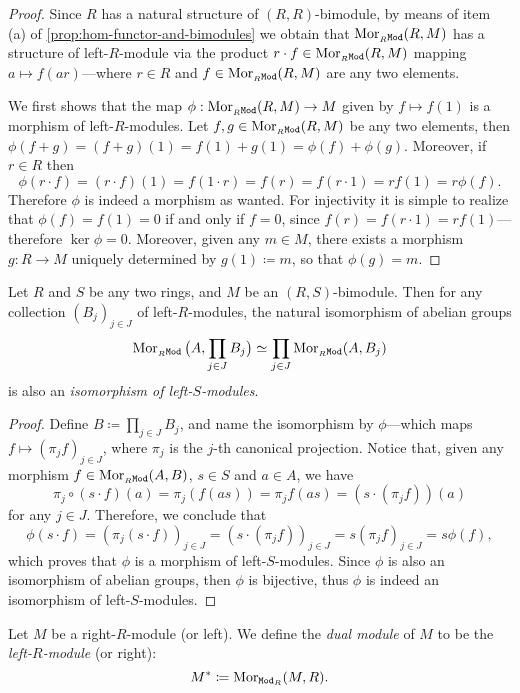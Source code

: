 \begin{proof}
Since \(R\) has a natural structure of \((R, R)\)-bimodule, by means of item (a)
of \cref{prop:hom-functor-and-bimodules} we obtain that
\(\operatorname{Mor}_{{{}_{R}\texttt{Mod}}}(R, M)\) has a structure of left-\(R\)-module via the product
\(r \cdot f \in \operatorname{Mor}_{{{}_{R}\texttt{Mod}}}(R, M)\) mapping \(a \mapsto f(a r)\)---where
\(r \in R\) and \(f \in \operatorname{Mor}_{{{}_{R}\texttt{Mod}}}(R, M)\) are any two elements.

We first shows that the map \(\phi: \operatorname{Mor}_{{{}_{R}\texttt{Mod}}}(R, M) \to M\) given by
\(f \mapsto f(1)\) is a morphism of left-\(R\)-modules. Let
\(f, g \in \operatorname{Mor}_{{{}_{R}\texttt{Mod}}}(R, M)\) be any two elements, then
\(\phi(f + g) = (f + g)(1) = f(1) + g(1) = \phi(f) + \phi(g)\). Moreover, if
\(r \in R\) then
\[
\phi(r \cdot f) = (r \cdot f)(1) = f(1 \cdot r)
= f(r) = f(r \cdot 1) = r f(1) = r \phi(f).
\]
Therefore \(\phi\) is indeed a morphism as wanted. For injectivity it is simple
to realize that \(\phi(f) = f(1) = 0\) if and only if \(f = 0\), since
\(f(r) = f(r \cdot 1) = r f(1)\)---therefore \(\ker \phi = 0\). Moreover, given
any \(m \in M\), there exists a morphism \(g: R \to M\) uniquely determined by
\(g(1) \coloneq m\), so that \(\phi(g) = m\).
\end{proof}

\begin{theorem}
\label{thm:iso-prod-bimodules-morphism-set}
Let \(R\) and \(S\) be any two rings, and \(M\) be an \((R, S)\)-bimodule. Then
for any collection \((B_j)_{j \in J}\) of left-\(R\)-modules, the natural
isomorphism of abelian groups
\[
\operatorname{Mor}_{{{}_{R}\texttt{Mod}}}\big(A, \prod_{j \in J} B_j\big)
\simeq
\prod_{j \in J} \operatorname{Mor}_{{{}_{R}\texttt{Mod}}}(A, B_j)
\]
is also an \emph{isomorphism of left-\(S\)-modules}.
\end{theorem}

\begin{proof}
Define \(B \coloneq \prod_{j \in J} B_j\), and name the isomorphism by
\(\phi\)---which maps \(f \mapsto (\pi_j f)_{j \in J}\), where \(\pi_j\) is the
\(j\)-th canonical projection. Notice that, given any morphism \(f \in
\operatorname{Mor}_{{{}_{R}\texttt{Mod}}}(A, B)\), \(s \in S\) and \(a \in A\), we have
\[
\pi_j \circ (s \cdot f)(a) = \pi_j(f(a s))
= \pi_j f(a s) = (s \cdot (\pi_j f))(a)
\]
for any \(j \in J\). Therefore, we conclude that
\[
\phi(s \cdot f) = (\pi_j(s \cdot f))_{j \in J} = (s \cdot (\pi_j f))_{j \in J}
= s (\pi_j f)_{j \in J} = s \phi(f),
\]
which proves that \(\phi\) is a morphism of left-\(S\)-modules. Since \(\phi\)
is also an isomorphism of abelian groups, then \(\phi\) is bijective, thus
\(\phi\) is indeed an isomorphism of left-\(S\)-modules.
\end{proof}

\begin{definition}
\label{def:dual-module}
Let \(M\) be a right-\(R\)-module (or left). We define
the \emph{dual module} of \(M\) to be the \emph{left-\(R\)-module}
(or right):
\[
M^{*} \coloneq \operatorname{Mor}_{{\texttt{Mod}_{R}}}(M, R).
\]
\end{definition}



